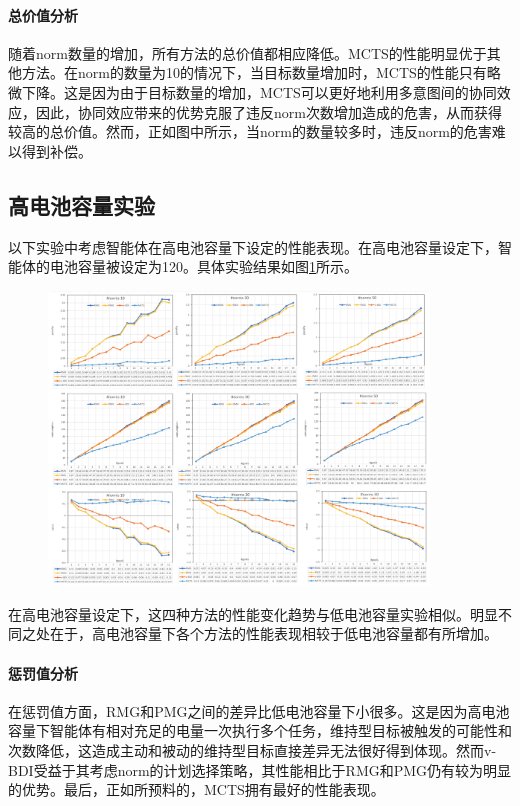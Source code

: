 \paragraph{总价值分析}
随着norm数量的增加，所有方法的总价值都相应降低。MCTS的性能明显优于其他方法。在norm的数量为10的情况下，当目标数量增加时，MCTS的性能只有略微下降。这是因为由于目标数量的增加，MCTS可以更好地利用多意图间的协同效应，因此，协同效应带来的优势克服了违反norm次数增加造成的危害，从而获得较高的总价值。然而，正如图中所示，当norm的数量较多时，违反norm的危害难以得到补偿。

\subsection{高电池容量实验}
以下实验中考虑智能体在高电池容量下设定的性能表现。在高电池容量设定下，智能体的电池容量被设定为120。具体实验结果如图\ref{fig:ltl_high}所示。

\begin{figure}[htb]
\centering
\includegraphics[width=0.9\textwidth]{./figs/ltl_high_battery}
\label{fig:ltl_high}
\end{figure}

在高电池容量设定下，这四种方法的性能变化趋势与低电池容量实验相似。明显不同之处在于，高电池容量下各个方法的性能表现相较于低电池容量都有所增加。
\paragraph{惩罚值分析}
在惩罚值方面，RMG和PMG之间的差异比低电池容量下小很多。这是因为高电池容量下智能体有相对充足的电量一次执行多个任务，维持型目标被触发的可能性和次数降低，这造成主动和被动的维持型目标直接差异无法很好得到体现。然而v-BDI受益于其考虑norm的计划选择策略，其性能相比于RMG和PMG仍有较为明显的优势。最后，正如所预料的，MCTS拥有最好的性能表现。
